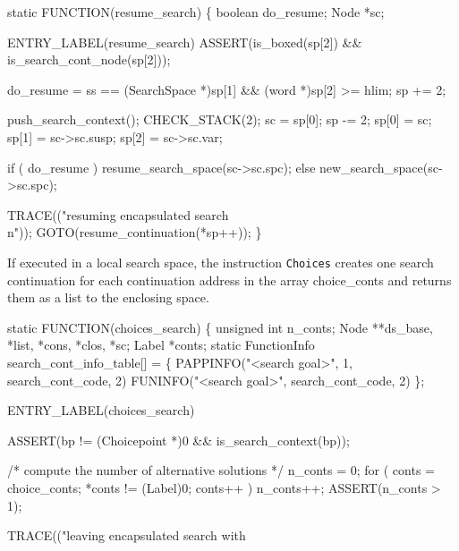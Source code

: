\nwenddocs{}\plusendmoddef\nwstartdeflinemarkup{}\nwenddeflinemarkup
static
FUNCTION(resume_search)
\{
    boolean do_resume;
    Node    *sc;

 ENTRY_LABEL(resume_search)
    ASSERT(is_boxed(sp[2]) && is_search_cont_node(sp[2]));

    do_resume = ss == (SearchSpace *)sp[1] && (word *)sp[2] >= hlim;
    sp       += 2;

    push_search_context();
    CHECK_STACK(2);
    sc    = sp[0];
    sp   -= 2;
    sp[0] = sc;
    sp[1] = sc->sc.susp;
    sp[2] = sc->sc.var;

    if ( do_resume )
        resume_search_space(sc->sc.spc);
    else
        new_search_space(sc->sc.spc);

    TRACE(("resuming encapsulated search\\n"));
    GOTO(resume_continuation(*sp++));
\}

\nwendcode{}\nwdocspar
If executed in a local search space, the instruction \texttt{Choices}
creates one search continuation for each continuation address in the
array {\Tt{}choice{\_}conts\nwendquote} and returns them as a list to the enclosing
space.

\nwenddocs{}\plusendmoddef\nwstartdeflinemarkup{}\nwenddeflinemarkup
static
FUNCTION(choices_search)
\{
    unsigned int n_conts;
    Node         **ds_base, *list, *cons, *clos, *sc;
    Label        *conts;
    static FunctionInfo search_cont_info_table[] = \{
        PAPPINFO("<search goal>", 1, search_cont_code, 2)
        FUNINFO("<search goal>",     search_cont_code, 2)
    \};

 ENTRY_LABEL(choices_search)

    ASSERT(bp != (Choicepoint *)0 && is_search_context(bp));

    /* compute the number of alternative solutions */
    n_conts = 0;
    for ( conts = choice_conts; *conts != (Label)0; conts++ )
        n_conts++;
    ASSERT(n_conts > 1);

    TRACE(("leaving encapsulated search with %

